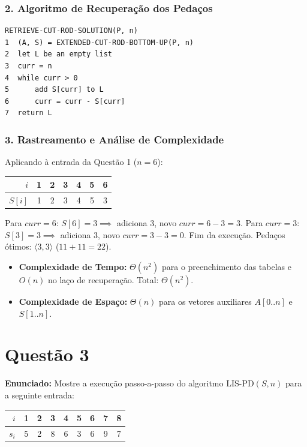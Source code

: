 \documentclass[11pt,a4paper]{article}
\begin{document}
\subsubsection*{2. Algoritmo de Recuperação dos Pedaços}

\begin{lstlisting}
RETRIEVE-CUT-ROD-SOLUTION(P, n)
1  (A, S) = EXTENDED-CUT-ROD-BOTTOM-UP(P, n)
2  let L be an empty list
3  curr = n
4  while curr > 0
5      add S[curr] to L
6      curr = curr - S[curr]
7  return L
\end{lstlisting}

\subsubsection*{3. Rastreamento e Análise de Complexidade}
Aplicando à entrada da Questão 1 ($n = 6$):
\begin{center}
\begin{tabular}{r|cccccc}
\toprule
$i$ & 1 & 2 & 3 & 4 & 5 & 6 \\
\midrule
$S[i]$ & 1 & 2 & 3 & 4 & 5 & 3 \\
\bottomrule
\end{tabular}
\end{center}
Para $curr = 6$: $S[6] = 3 \implies$ adiciona 3, novo $curr = 6 - 3 = 3$. Para $curr = 3$: $S[3] = 3 \implies$ adiciona 3, novo $curr = 3 - 3 = 0$. Fim da execução. Pedaços ótimos: $\langle 3, 3 \rangle$ ($11 + 11 = 22$).
\begin{itemize}
    \item \textbf{Complexidade de Tempo:} $\Theta(n^2)$ para o preenchimento das tabelas e $O(n)$ no laço de recuperação. Total: $\Theta(n^2)$.
    \item \textbf{Complexidade de Espaço:} $\Theta(n)$ para os vetores auxiliares $A[0..n]$ e $S[1..n]$.
\end{itemize}

\vspace{0.4cm}

\section*{Questão 3}
\textbf{Enunciado:} Mostre a execução passo-a-passo do algoritmo \textsc{LIS-PD}$(S, n)$ para a seguinte entrada:
\begin{center}
\begin{tabular}{r|cccccccc}
\toprule
$i$ & 1 & 2 & 3 & 4 & 5 & 6 & 7 & 8 \\
\midrule
$s_i$ & 5 & 2 & 8 & 6 & 3 & 6 & 9 & 7 \\
\bottomrule
\end{tabular}
\end{center}
\end{document}
